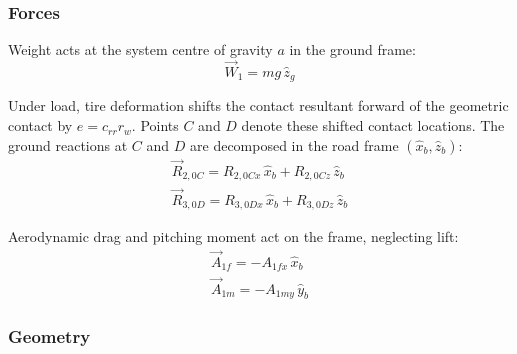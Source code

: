 \documentclass[10pt]{extarticle}
\numberwithin{equation}{subsubsection}
\begin{document}
\subsubsection{Forces}

Weight acts at the system centre of gravity $a$ in the ground frame:
\begin{equation}
    \vec{W}_1 = mg\,\hat{z}_g
\end{equation}

Under load, tire deformation shifts the contact resultant forward of the geometric contact by $e = c_{rr}r_w$. Points $C$ and $D$ denote these shifted contact locations. The ground reactions at $C$ and $D$ are decomposed in the road frame $(\hat{x}_b, \hat{z}_b)$:
\begin{gather}
    \vec{R}_{2,0C} = R_{2,0Cx}\,\hat{x}_b + R_{2,0Cz}\,\hat{z}_b \\
    \vec{R}_{3,0D} = R_{3,0Dx}\,\hat{x}_b + R_{3,0Dz}\,\hat{z}_b
\end{gather}

Aerodynamic drag and pitching moment act on the frame, neglecting lift:
\begin{gather}
    \vec{A}_{1f} = -A_{1fx}\,\hat{x}_b \\
    \vec{A}_{1m} = -A_{1my}\,\hat{y}_b
\end{gather}

\subsubsection{Geometry}
\end{document}

